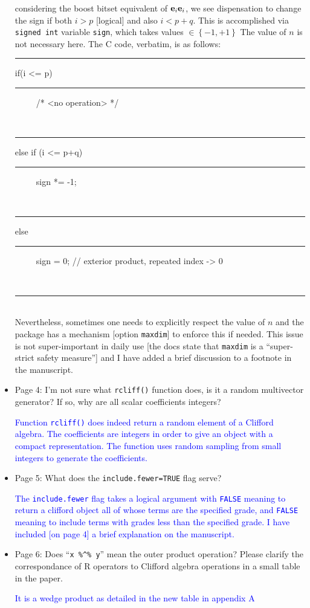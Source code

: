 \documentclass{article}
\newcommand{\ei}[1]{\ensuremath{{\bf e}_{#1}}}
\begin{document}
\begin{itemize}
{considering the boost bitset equivalent of $\ei{i}\ei{i}$, we see
dispensation to change the sign 
if both $i>p$ [logical] and also $i<p+q$.  This is accomplished via
{\tt signed int} variable {\tt sign}, which takes values
$\in\left\lbrace -1,+1\right\rbrace$ The value of $n$ is not necessary
here.  The C code, verbatim, is as follows:\\[20pt]
{\tt\rule{10mm}{0mm}if(i <= p)\string{}\\
{\tt\rule{10mm}{0mm}\ \ \ \ \ /* <no operation>   */}\\
{\tt\rule{10mm}{0mm} \string} else if (i <= p+q)\string{}\\
{\tt\rule{10mm}{0mm}\ \ \ \ \  sign *= -1;}\\
{\tt\rule{10mm}{0mm}  \string} else \string{}\\
{\tt\rule{10mm}{0mm}\ \ \ \ \  sign = 0; // exterior product, repeated index -> 0}\\
{\tt\rule{10mm}{0mm}  \string}}\\[20pt]
Nevertheless, sometimes one needs to explicitly respect the value of $n$
and the package has a mechanism [option {\tt maxdim}] to enforce this
if needed.  This issue is not super-important in daily use [the docs
  state that {\tt maxdim} is a ``super-strict safety measure''] and I
have added a brief discussion to a footnote in the manuscript.  }

\item Page 4: I'm not sure what {\tt rcliff()} function does, is it a
  random multivector generator? If so, why are all scalar coefficients
  integers?

  \textcolor{blue}{Function {\tt rcliff()} does indeed return a random
    element of a Clifford algebra.  The coefficients are integers in
    order to give an object with a compact representation.  The
    function uses random sampling from small integers to generate the
    coefficients.}

\item Page 5: What does the {\tt include.fewer=TRUE} flag serve?

  \textcolor{blue}{The {\tt include.fewer} flag takes a logical
    argument with {\tt FALSE} meaning to return a clifford object all
    of whose terms are the specified grade, and {\tt FALSE} meaning to
    include terms with grades less than the specified grade.  I have
    included [on page 4] a brief explanation on the manuscript.}

\item Page 6: Does ``{\tt x \%\string^\% y}'' mean the outer product
  operation?  Please clarify the correspondance of R operators to
  Clifford algebra operations in a small table in the paper.

  \textcolor{blue}{It is a wedge product as detailed in the new table
    in appendix A}

\end{itemize}
\end{document}
